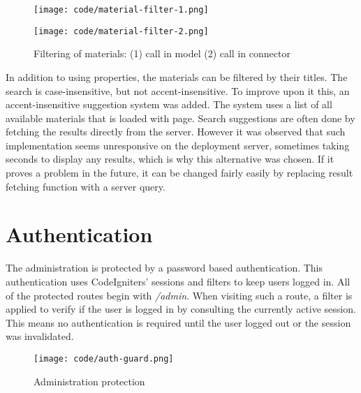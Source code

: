 \documentclass[
  digital,     %
  oneside,     %
  nosansbold,  %
  colorbold, %
  lof,         %
  lot,         %
]{fithesis4}
\begin{document}
\begin{figure}[!htbp]
	\begin{center}
		\begin{minipage}{.8\textwidth}
			\texttt{[image: code/material-filter-1.png]}
		\end{minipage}
		\begin{minipage}{.8\textwidth}
			\texttt{[image: code/material-filter-2.png]}
		\end{minipage}
	\end{center}
	\caption{Filtering of materials: (1) call in model (2) call in connector }
	\label{fig:material-filter}
\end{figure}

In addition to using properties, the materials can be filtered by their titles. The search is case-insensitive, but not accent-insensitive. To improve upon it this, an accent-insensitive suggestion system was added. The system uses a list of all available materials that is loaded with page. Search suggestions are often done by fetching the results directly from the server. However it was observed that such implementation seems unresponsive on the deployment server, sometimes taking seconds to display any results, which is why this alternative was chosen. If it proves a problem in the future, it can be changed fairly easily by replacing result fetching function with a server query.

\section{Authentication}
\label{sect:authentication}

The administration is protected by a password based authentication. This authentication uses CodeIgniters' sessions and filters to keep users logged in. All of the protected routes begin with \textit{/admin}. When visiting such a route, a filter is applied to verify if the user is logged in by consulting the currently active session. This means no authentication is required until the user logged out or the session was invalidated. 

\begin{figure}[!htbp]
	\begin{center}
		\begin{minipage}{.8\textwidth}
			\texttt{[image: code/auth-guard.png]}
		\end{minipage}
	\end{center}
	\caption{Administration protection}
	\label{fig:auth-guard}
\end{figure}
\end{document}
